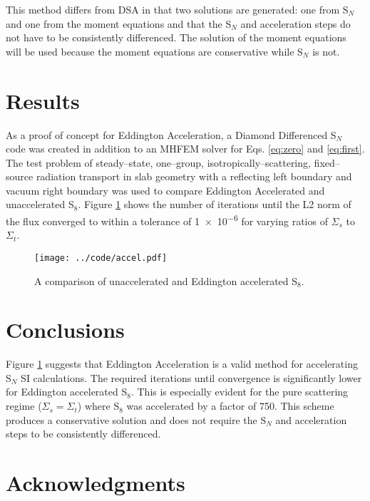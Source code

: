 \documentclass{anstrans}
\newcommand{\SN}{S$_N$\xspace}
\begin{document}
	This method differs from DSA in that two solutions are generated: one from \SN and one from the moment equations and that the \SN and acceleration steps do not have to be consistently differenced. The solution of the moment equations will be used because the moment equations are conservative while \SN is not. 
\section{Results}
	As a proof of concept for Eddington Acceleration, a Diamond Differenced \SN code was created in addition to an MHFEM solver for Eqs. \ref{eq:zero} and \ref{eq:first}. The test problem of steady--state, one--group, isotropically--scattering, fixed--source radiation transport in slab geometry with a reflecting left boundary and vacuum right boundary was used to compare Eddington Accelerated and unaccelerated S$_8$. Figure \ref{fig:comparison} shows the number of iterations until the L2 norm of the flux converged to within a tolerance of \num{1e-6} for varying ratios of $\Sigma_s$ to $\Sigma_t$. 


	\begin{figure}[ht] %
	  \centering
	  \texttt{[image: ../code/accel.pdf]}
	  \caption{A comparison of unaccelerated and Eddington accelerated S$_8$. }
	  \label{fig:comparison}
	\end{figure}

\section{Conclusions}
	Figure \ref{fig:comparison} suggests that Eddington Acceleration is a valid method for accelerating \SN SI calculations. The required iterations until convergence is significantly lower for Eddington accelerated S$_8$. This is especially evident for the pure scattering regime ($\Sigma_s = \Sigma_t$) where S$_8$ was accelerated by a factor of 750. This scheme produces a conservative solution and does not require the \SN and acceleration steps to be consistently differenced. 

\section{Acknowledgments}



\end{document}

